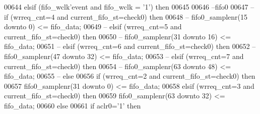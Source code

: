 \begin{DoxyCode}
00644         \textcolor{keywordflow}{elsif} \textcolor{vhdlchar}{(}\textcolor{vhdlchar}{fifo_wclk}\textcolor{vhdlchar}{'}\textcolor{vhdlkeyword}{event} \textcolor{keywordflow}{and} \textcolor{vhdlchar}{fifo_wclk} \textcolor{vhdlchar}{=} \textcolor{vhdlchar}{'}\textcolor{vhdllogic}{}\textcolor{vhdllogic}{1}\textcolor{vhdlchar}{'}\textcolor{vhdlchar}{)} \textcolor{keywordflow}{then}
00645          
00646 \textcolor{keyword}{          --fifo0}
00647 \textcolor{keyword}{--        if (wrreq\_cnt=4 and current\_fifo\_st=check0) then }
00648 \textcolor{keyword}{--          fifo0\_samplenr(15 downto 0) <= fifo\_data;}
00649 \textcolor{keyword}{--        elsif (wrreq\_cnt=5 and current\_fifo\_st=check0) then}
00650 \textcolor{keyword}{--          fifo0\_samplenr(31 downto 16) <= fifo\_data;}
00651 \textcolor{keyword}{--        elsif (wrreq\_cnt=6 and current\_fifo\_st=check0) then}
00652 \textcolor{keyword}{--          fifo0\_samplenr(47 downto 32) <= fifo\_data; }
00653 \textcolor{keyword}{--        elsif (wrreq\_cnt=7 and current\_fifo\_st=check0) then}
00654 \textcolor{keyword}{--          fifo0\_samplenr(63 downto 48) <= fifo\_data;    }
00655 \textcolor{keyword}{--        else}
00656           \textcolor{keywordflow}{if} \textcolor{vhdlchar}{(}\textcolor{vhdlchar}{wrreq_cnt}\textcolor{vhdlchar}{=}\textcolor{vhdllogic}{}\textcolor{vhdllogic}{2} \textcolor{keywordflow}{and} \textcolor{vhdlchar}{current_fifo_st}\textcolor{vhdlchar}{=}\textcolor{vhdlchar}{check0}\textcolor{vhdlchar}{)} \textcolor{keywordflow}{then} 
00657             \textcolor{vhdlchar}{fifo0_samplenr}\textcolor{vhdlchar}{(}\textcolor{vhdllogic}{}\textcolor{vhdllogic}{31} \textcolor{keywordflow}{downto} \textcolor{vhdllogic}{}\textcolor{vhdllogic}{0}\textcolor{vhdlchar}{)} \textcolor{vhdlchar}{<=} \textcolor{vhdlchar}{fifo_data};
00658           \textcolor{keywordflow}{elsif} \textcolor{vhdlchar}{(}\textcolor{vhdlchar}{wrreq_cnt}\textcolor{vhdlchar}{=}\textcolor{vhdllogic}{}\textcolor{vhdllogic}{3} \textcolor{keywordflow}{and} \textcolor{vhdlchar}{current_fifo_st}\textcolor{vhdlchar}{=}\textcolor{vhdlchar}{check0}\textcolor{vhdlchar}{)} \textcolor{keywordflow}{then}
00659             \textcolor{vhdlchar}{fifo0_samplenr}\textcolor{vhdlchar}{(}\textcolor{vhdllogic}{}\textcolor{vhdllogic}{63} \textcolor{keywordflow}{downto} \textcolor{vhdllogic}{}\textcolor{vhdllogic}{32}\textcolor{vhdlchar}{)} \textcolor{vhdlchar}{<=} \textcolor{vhdlchar}{fifo_data};    
00660           \textcolor{keywordflow}{else}
00661             \textcolor{keywordflow}{if} \textcolor{vhdlchar}{aclr0}\textcolor{vhdlchar}{=}\textcolor{vhdlchar}{'}\textcolor{vhdllogic}{}\textcolor{vhdllogic}{1}\textcolor{vhdlchar}{'} \textcolor{keywordflow}{then} 

\end{DoxyCode}
